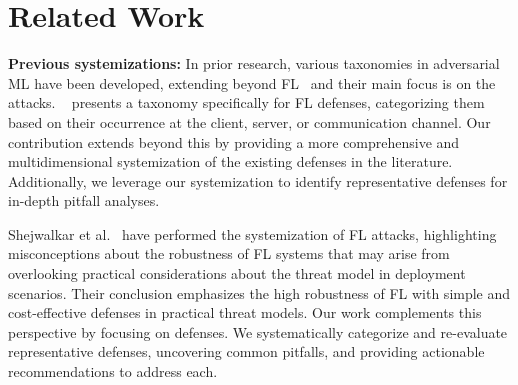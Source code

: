 \section{Related Work}
\label{sec:related}
\noindent\textbf{Previous systemizations: }
In prior research, various taxonomies
in adversarial ML have been developed, extending beyond
FL~\cite{goldblum2020dataset, jere2020taxonomy, barreno2010the, biggio2018wild, huang2011adversarial, rodriguez2023survey} and their main focus is on the attacks.
~\cite{rodriguez2023survey}  presents a taxonomy specifically for FL defenses, categorizing them based on their occurrence at the client, server, or communication channel. Our contribution extends beyond this by providing a more comprehensive and multidimensional systemization of the existing defenses in the literature. Additionally, we leverage our systemization to identify representative defenses for in-depth pitfall analyses.


Shejwalkar et al.~\cite{shejwalkar2022back} have performed the systemization of FL attacks, highlighting misconceptions about the robustness of FL systems that may arise from overlooking practical considerations about the threat model in deployment scenarios. Their conclusion emphasizes the high robustness of FL with simple and cost-effective defenses in practical threat models. Our work complements this perspective by focusing on defenses. We systematically categorize and re-evaluate representative defenses, uncovering common pitfalls, and providing actionable recommendations to address each.

